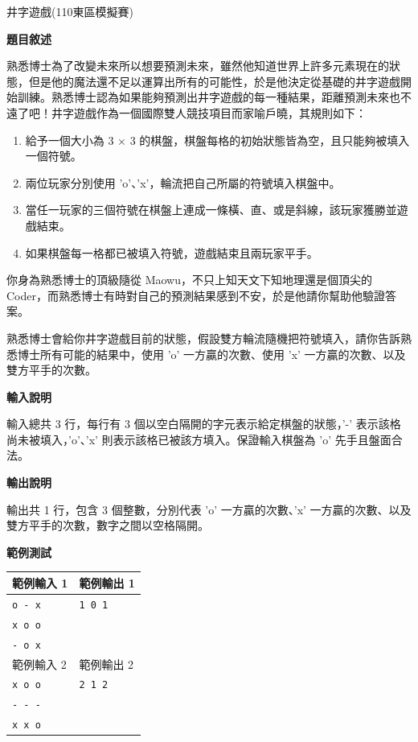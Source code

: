     \example 井字遊戲(110東區模擬賽)

    \textbf{題目敘述}
    
    熟悉博士為了改變未來所以想要預測未來，雖然他知道世界上許多元素現在的狀態，但是他的魔法還不足以運算出所有的可能性，於是他決定從基礎的井字遊戲開始訓練。熟悉博士認為如果能夠預測出井字遊戲的每一種結果，距離預測未來也不遠了吧！井字遊戲作為一個國際雙人競技項目而家喻戶曉，其規則如下：

    \begin{enumerate}
        \item 給予一個大小為 3 × 3 的棋盤，棋盤每格的初始狀態皆為空，且只能夠被填入一個符號。
        \item 兩位玩家分別使用 'o'、'x'，輪流把自己所屬的符號填入棋盤中。
        \item 當任一玩家的三個符號在棋盤上連成一條橫、直、或是斜線，該玩家獲勝並遊戲結束。
        \item 如果棋盤每一格都已被填入符號，遊戲結束且兩玩家平手。
    \end{enumerate}

    你身為熟悉博士的頂級隨從 Maowu，不只上知天文下知地理還是個頂尖的 Coder，而熟悉博士有時對自己的預測結果感到不安，於是他請你幫助他驗證答案。
    
    熟悉博士會給你井字遊戲目前的狀態，假設雙方輪流隨機把符號填入，請你告訴熟悉博士所有可能的結果中，使用 'o' 一方贏的次數、使用 'x' 一方贏的次數、以及雙方平手的次數。

    \textbf{輸入說明}

    輸入總共 3 行，每行有 3 個以空白隔開的字元表示給定棋盤的狀態，'-' 表示該格尚未被填入，'o'、'x' 則表示該格已被該方填入。保證輸入棋盤為 'o' 先手且盤面合法。

    \textbf{輸出說明}
    
    輸出共 1 行，包含 3 個整數，分別代表 'o' 一方贏的次數、'x' 一方贏的次數、以及雙方平手的次數，數字之間以空格隔開。

    \textbf{範例測試}

    \begin{tabular}{|m{7cm}|m{7cm}|}
        \hline
        範例輸入 1 & 範例輸出 1 \\
        \hline
        \verb|o - x| &  \verb|1 0 1| \\
        \verb|x o o| &  \\
        \verb|- o x| &  \\
        \hline
        範例輸入 2 & 範例輸出 2 \\
        \hline
        \verb|x o o| &  \verb|2 1 2| \\
        \verb|- - -| &  \\
        \verb|x x o| &  \\
        \hline
    \end{tabular}

